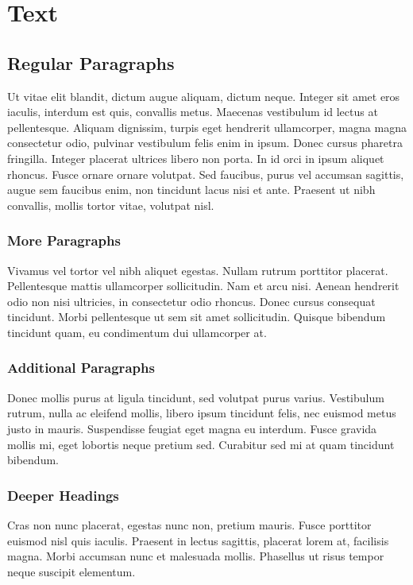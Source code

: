 \chapter{Text}

\section{Regular Paragraphs}

Ut vitae elit blandit, dictum augue aliquam, dictum neque. Integer sit amet eros
iaculis, interdum est quis, convallis metus. Maecenas vestibulum id lectus at
pellentesque. Aliquam dignissim, turpis eget hendrerit ullamcorper, magna magna
consectetur odio, pulvinar vestibulum felis enim in ipsum. Donec cursus pharetra
fringilla. Integer placerat ultrices libero non porta. In id orci in ipsum
aliquet rhoncus. Fusce ornare ornare volutpat. Sed faucibus, purus vel accumsan
sagittis, augue sem faucibus enim, non tincidunt lacus nisi et ante. Praesent ut
nibh convallis, mollis tortor vitae, volutpat nisl.

\subsection{More Paragraphs}

Vivamus vel tortor vel nibh aliquet egestas. Nullam rutrum porttitor placerat.
Pellentesque mattis ullamcorper sollicitudin. Nam et arcu nisi. Aenean hendrerit
odio non nisi ultricies, in consectetur odio rhoncus. Donec cursus consequat
tincidunt. Morbi pellentesque ut sem sit amet sollicitudin. Quisque bibendum
tincidunt quam, eu condimentum dui ullamcorper at.

\subsection{Additional Paragraphs}

Donec mollis purus at ligula tincidunt, sed volutpat purus varius. Vestibulum
rutrum, nulla ac eleifend mollis, libero ipsum tincidunt felis, nec euismod
metus justo in mauris. Suspendisse feugiat eget magna eu interdum. Fusce gravida
mollis mi, eget lobortis neque pretium sed. Curabitur sed mi at quam tincidunt
bibendum.

\subsection{Deeper Headings}

Cras non nunc placerat, egestas nunc non, pretium mauris. Fusce porttitor
euismod nisl quis iaculis. Praesent in lectus sagittis, placerat lorem at,
facilisis magna. Morbi accumsan nunc et malesuada mollis. Phasellus ut risus
tempor neque suscipit elementum.

